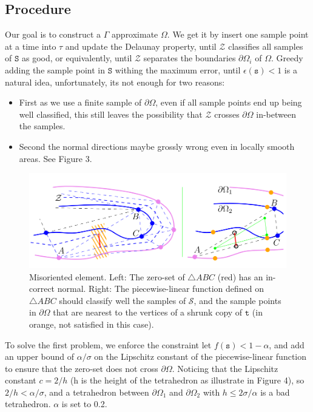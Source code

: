 \documentclass{article}
\theoremstyle{definition}
\theoremstyle{remark}
\begin{document}
\subsection{Procedure}
Our goal is to construct a $\Gamma$ approximate $\Omega$. We get it by insert one sample point at a time into $\tau$ and update the Delaunay property, until $\mathcal{Z}$ classifies all samples of  $\mathtt{S}$ as good, or equivalently, until $\mathcal{Z}$ separates the boundaries $\partial \Omega_i$ of $\Omega$.
Greedy adding the sample point in  $\mathtt{S}$ withing the maximum error, until $\epsilon(\mathtt{s})<1$ is a natural idea, unfortunately, its not enough for two reasons:
\begin{itemize}
\item First as we use a finite sample of $\partial \Omega$, even if all sample points end up being well classified, this still leaves the possibility that $\mathcal{Z}$ crosses $\partial \Omega$ in-between the samples.
 \item Second the normal directions maybe grossly wrong even in locally smooth areas. See Figure 3.
 \end{itemize}
\begin{figure}[H]
 	\includegraphics[width=12cm]{3}
	\caption[Misoriented element]
        {Misoriented element. Left: The zero-set of $\bigtriangleup ABC$ (red) has an in-correct normal. Right: The piecewise-linear function defined on $\bigtriangleup ABC$ should classify well the samples of $\mathcal{S}$, and the sample points in $\partial \Omega$ that are nearest to the vertices of a shrunk copy of $\mathtt{t}$ (in orange, not satisfied in this case).}
 	\centering
\end{figure}
\par To solve the first problem, we enforce the constraint let $f(\mathtt{s}) < 1 - \alpha$, and add an upper bound of $\alpha / \sigma$ on the Lipschitz constant of the piecewise-linear function to ensure that the zero-set does not cross $\partial \Omega$.  Noticing that  the Lipschitz constant $c=2/h$ (h is the height of the tetrahedron as illustrate in Figure 4), so $2/h < \alpha / \sigma$, and a tetrahedron between $\partial \Omega_1$ and $\partial \Omega_2$ with $h \le 2\sigma / \alpha$ is a bad tetrahedron. $\alpha$ is set to 0.2.
\end{document}
